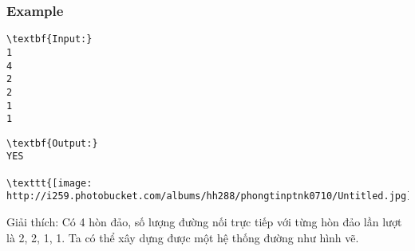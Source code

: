 \subsubsection{Example}
\begin{verbatim}
\textbf{Input:}
1
4
2
2
1
1\end{verbatim}
\begin{verbatim}
\textbf{Output:}
YES

\texttt{[image: http://i259.photobucket.com/albums/hh288/phongtinptnk0710/Untitled.jpg]}\end{verbatim}

Giải thích: Có 4 hòn đảo, số lượng đường nối trực tiếp với từng hòn đảo lần lượt là 2, 2, 1, 1. Ta có thể xây dựng được một hệ thống đường như hình vẽ.
